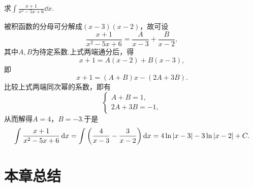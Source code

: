 \begin{example}
求\(\int \frac{x+1}{x^2-5x+6} \dd{x}\).
\begin{solution}
被积函数的分母可分解成\((x-3)(x-2)\)，故可设\[
\frac{x+1}{x^2-5x+6}
= \frac{A}{x-3} + \frac{B}{x-2},
\]其中\(A,B\)为待定系数.上式两端通分后，得\[
x+1 = A(x-2)+B(x-3),
\]即\[
x+1 = (A+B)x -(2A+3B).
\]比较上式两端同次幂的系数，即有\[
\left\{ \begin{array}{l}
A+B = 1, \\
2A+3B = -1,
\end{array} \right.
\]从而解得\(A=4\)，\(B=-3\).于是\[
\int \frac{x+1}{x^2-5x+6} \dd{x}
= \int \left(\frac{4}{x-3} - \frac{3}{x-2}\right) \dd{x}
= 4\ln\abs{x-3} - 3\ln\abs{x-2} + C.
\]
\end{solution}
\end{example}

\section{本章总结}
